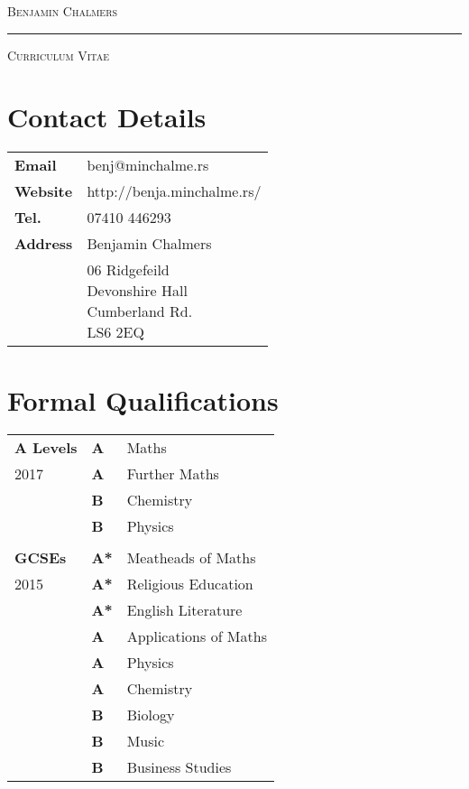 \documentclass[10pt,a4paper]{article}
\begin{document}
\begin{center}

  \textsc{\Huge{Benjamin Chalmers}}
  \vspace{0.3cm}

  \noindent\rule{0.8\textwidth}{0.4pt}
  \vspace{0.3cm}

  \textsc{\large{Curriculum Vitae}}
  \vspace{0.2cm}

\end{center}
\begin{multicols*}{2}
  \section*{Contact Details} 
\begin{center}
  \begin{tabular}{p{2cm}p{6cm}}
    \textbf{Email}&benj@minchalme.rs\\
    \textbf{Website}&http://benja.minchalme.rs/\\
    \textbf{Tel.}&07410 446293\\
    \textbf{Address}&Benjamin Chalmers\\
    &\parbox{5cm}{06 Ridgefeild\\Devonshire Hall\\Cumberland Rd.\\LS6 2EQ}\\
  \end{tabular}
\end{center}

  \section*{Formal Qualifications}
\begin{center}
  \begin{tabular}{p{2cm} p{0.6cm} p{5.4cm}}
    \textbf{A Levels}&\textbf{A}&Maths\\
	2017&\textbf{A}&Further Maths\\
	    &\textbf{B}&Chemistry\\
	    &\textbf{B}&Physics\\
\\
    \textbf{GCSEs}&\textbf{A*}&Meatheads of Maths\\
	2015&\textbf{A*}&Religious Education\\
	    &\textbf{A*}&English Literature\\
 	    &\textbf{A}&Applications of Maths\\
	    &\textbf{A}&Physics\\
	    &\textbf{A}&Chemistry\\
	    &\textbf{B}&Biology\\
	    &\textbf{B}&Music\\
	    &\textbf{B}&Business Studies\\
  \end{tabular}
\end{center}


\end{multicols*}
\end{document}
